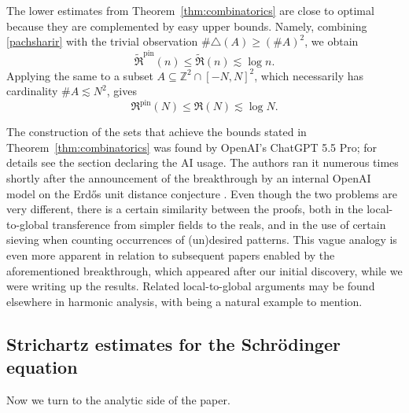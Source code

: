 \documentclass[10pt,a4paper]{amsart}
\numberwithin{equation}{section}
\renewcommand{\leq}{\leqslant}
\renewcommand{\geq}{\geqslant}
\begin{document}
The lower estimates from Theorem~\ref{thm:combinatorics} are close to optimal because they are complemented by easy upper bounds. Namely, combining \eqref{pachsharir} with the trivial observation $\#\triangle(A)\geq(\#A)^2$, we obtain
\[ \widetilde{\mathfrak{R}}^{\mathrm{pin}}(n) \leq \widetilde{\mathfrak{R}}(n) \lesssim \log n. \]
Applying the same to a subset $A\subseteq\mathbb{Z}^2\cap[-N,N]^2$, which necessarily has cardinality $\#A\lesssim N^2$, gives
\[ \mathfrak{R}^{\mathrm{pin}}(N) \leq \mathfrak{R}(N) \lesssim \log N. \]

The construction of the sets that achieve the bounds stated in Theorem~\ref{thm:combinatorics} was found by OpenAI's ChatGPT 5.5 Pro; for details see the section declaring the AI usage. The authors ran it numerous times shortly after the announcement of the breakthrough by an internal OpenAI model on the Erd\H{o}s unit distance conjecture \cite{OpenAIErdos,UnitErdos}. Even though the two problems are very different, there is a certain similarity between the proofs, both in the local-to-global transference from simpler fields to the reals, and in the use of certain sieving when counting occurrences of (un)desired patterns. This vague analogy is even more apparent in relation to subsequent papers \cite{SumProduct,SplitPrimes,CMPSY} enabled by the aforementioned breakthrough, which appeared after our initial discovery, while we were writing up the results. Related local-to-global arguments may be found elsewhere in harmonic analysis, with \cite{HW18} being a natural example to mention.

\subsection{Strichartz estimates for the Schr\"{o}dinger equation}
Now we turn to the analytic side of the paper.
\end{document}
